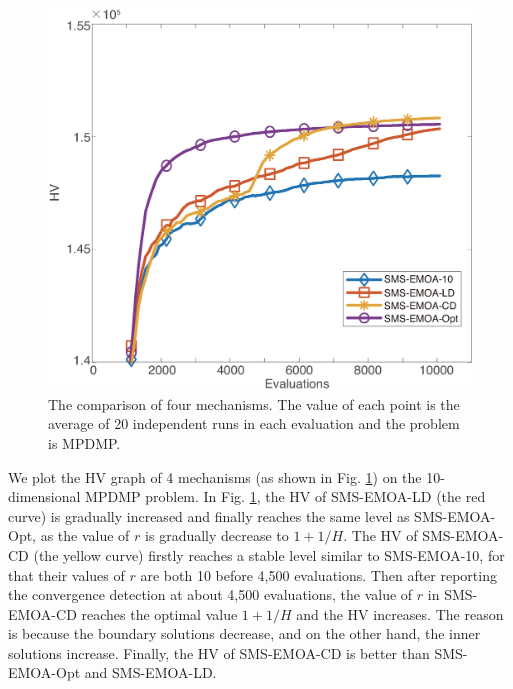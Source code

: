 \documentclass[conference]{IEEEtran}
\begin{document}
\begin{figure}[!t]
  \centering
    \includegraphics[width=\columnwidth]{SMSEMOA_MPDMP_hv_2}
  \caption{The comparison of four mechanisms. %
  The value of each point is the average of 20 independent runs in each evaluation
  and the problem is MPDMP. 
  }
  \label{crdmp}
\end{figure}
We plot the HV graph of 4 mechanisms (as shown in Fig. \ref{crdmp}) on the 10-dimensional MPDMP problem. 
In Fig. \ref{crdmp}, the HV of SMS-EMOA-LD (the red curve) is gradually increased 
and finally reaches the same level as SMS-EMOA-Opt, as the value of $r$ is gradually decrease to $1+1/H$.
The HV of SMS-EMOA-CD (the yellow curve) firstly reaches a stable level similar to SMS-EMOA-10, 
for that their values of $r$ are both 10 before 4,500 evaluations. 
Then after reporting the convergence detection at about 4,500 evaluations, 
the value of $r$ in SMS-EMOA-CD reaches the optimal value $1+1/H$ 
and the HV increases. 
The reason is because the boundary solutions decrease, and on the other hand, the inner solutions increase. 
Finally, the HV of SMS-EMOA-CD is better than SMS-EMOA-Opt and SMS-EMOA-LD. 
\end{document}
